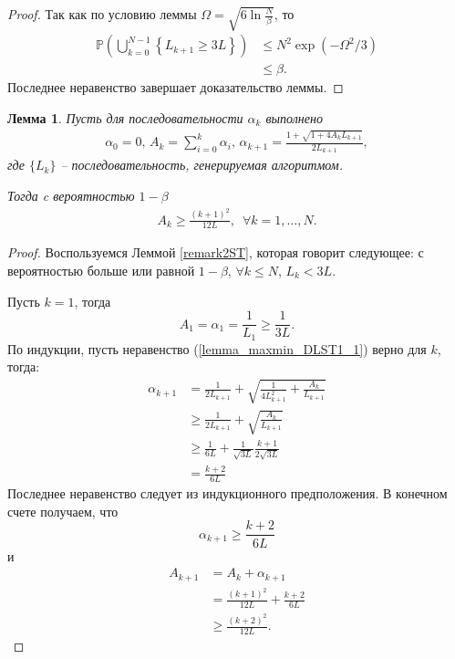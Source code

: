 \documentclass[11pt,a4]{article}
\newtheorem{lemma}{Лемма}
\newcommand*\circled[1]{\tikz[baseline=(char.base)]{
		\node[shape=circle,draw,inner sep=2pt] (char) {#1};}}
\begin{document}
\begin{proof}

Так как по условию леммы $\Omega = \sqrt{6\ln{\frac{N}{\beta}}}$, то
\begin{align*}
\mathbb{P}\left(\bigcup_{k=0}^{N-1}\left\{L_{k+1} \geq 3L\right\}\right) &\leq N^2\exp(-\Omega^2/3)\\ &\leq \beta.
\end{align*}
Последнее неравенство завершает доказательство леммы.
\end{proof}

\begin{lemma}
	\label{lemma_maxmin_DLST1}
	Пусть для последовательности $\alpha_k$ выполнено
	\begin{align*}
	\alpha_0 = 0,\,
	A_k = \sum_{i = 0}^{k}\alpha_i,\,
	\alpha_{k+1} = \frac{1 + \sqrt{1 + 4A_kL_{k+1}}}{2L_{k+1}},
	\end{align*}
	где $\{L_k\}$ -- последовательность, генерируемая алгоритмом.
	
	Тогда c вероятностью $1 - \beta$
	 \begin{align}
	 \label{lemma_maxmin_DLST1_1}
	 A_k \geq \frac{(k+1)^2}{12L},\,\,\,\forall k = 1,\dots,N.
	 \end{align}
\end{lemma}

\begin{proof}
Воспользуемся Леммой \ref{remark2ST}, которая говорит следующее: с вероятностью больше или равной $1 - \beta$, $\forall k \leq N$, $L_k < 3L$.
 
Пусть $k = 1$, тогда
	\begin{equation*}
	A_1 = \alpha_1 = \frac{1}{L_1} \geq \frac{1}{3L}.
	\end{equation*}
	По индукции, пусть неравенство (\ref{lemma_maxmin_DLST1_1}) верно для $k$, тогда:
	\begin{align*}
	\alpha_{k+1} &= \frac{1}{2L_{k+1}} + \sqrt{\frac{1}{4L_{k+1}^2} + \frac{A_{k}}{L_{k+1}}} \\&\geq 
	\frac{1}{2L_{k+1}} + \sqrt{\frac{A_{k}}{L_{k+1}}} \\&\geq
	\frac{1}{6L} + \frac{1}{\sqrt{3L}}\frac{k+1}{2\sqrt{3L}} \\&=
	\frac{k+2}{6L}
	\end{align*}
Последнее неравенство следует из индукционного предположения. В конечном счете получаем, что
	\begin{equation*}
	\alpha_{k+1} \geq \frac{k+2}{6L}
	\end{equation*}
и
	\begin{align*}
	A_{k+1} &= A_k + \alpha_{k+1} \\&= \frac{(k+1)^2}{12L} + \frac{k+2}{6L} \\&\geq \frac{(k+2)^2}{12L}.
	\end{align*}
\end{proof}
\end{document}
